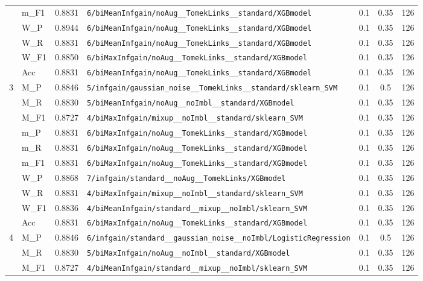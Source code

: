 \begin{table}[htbp]
\begin{tabular}{|c|l|c|>{\ttfamily\footnotesize}p{7.2cm}|c|c|c|}
 & m\_F1 & 0.8831 & \texttt{6/biMeanInfgain/noAug\_\_TomekLinks\_\_standard/XGBmodel} & 0.1 & 0.35  & 126 \\ 
 & W\_P & 0.8944 & \texttt{6/biMeanInfgain/noAug\_\_TomekLinks\_\_standard/XGBmodel} & 0.1 & 0.35  & 126 \\ 
 & W\_R & 0.8831 & \texttt{6/biMeanInfgain/noAug\_\_TomekLinks\_\_standard/XGBmodel} & 0.1 & 0.35  & 126 \\ 
 & W\_F1 & 0.8850 & \texttt{6/biMaxInfgain/noAug\_\_TomekLinks\_\_standard/XGBmodel} & 0.1 & 0.35  & 126 \\ 
 & Acc & 0.8831 & \texttt{6/biMeanInfgain/noAug\_\_TomekLinks\_\_standard/XGBmodel} & 0.1 & 0.35  & 126 \\ 
\hline
\multirow{10}{*}{3} & M\_P & 0.8846 & \texttt{5/infgain/gaussian\_noise\_\_TomekLinks\_\_standard/sklearn\_SVM} & 0.1 & 0.5  & 126 \\ 
 & M\_R & 0.8830 & \texttt{5/biMeanInfgain/noAug\_\_noImbl\_\_standard/XGBmodel} & 0.1 & 0.35  & 126 \\ 
 & M\_F1 & 0.8727 & \texttt{4/biMaxInfgain/mixup\_\_noImbl\_\_standard/sklearn\_SVM} & 0.1 & 0.35  & 126 \\ 
 & m\_P & 0.8831 & \texttt{6/biMaxInfgain/noAug\_\_TomekLinks\_\_standard/XGBmodel} & 0.1 & 0.35  & 126 \\ 
 & m\_R & 0.8831 & \texttt{6/biMaxInfgain/noAug\_\_TomekLinks\_\_standard/XGBmodel} & 0.1 & 0.35  & 126 \\ 
 & m\_F1 & 0.8831 & \texttt{6/biMaxInfgain/noAug\_\_TomekLinks\_\_standard/XGBmodel} & 0.1 & 0.35  & 126 \\ 
 & W\_P & 0.8868 & \texttt{7/infgain/standard\_\_noAug\_\_TomekLinks/XGBmodel} & 0.1 & 0.35  & 126 \\ 
 & W\_R & 0.8831 & \texttt{4/biMaxInfgain/mixup\_\_noImbl\_\_standard/sklearn\_SVM} & 0.1 & 0.35  & 126 \\ 
 & W\_F1 & 0.8836 & \texttt{4/biMeanInfgain/standard\_\_mixup\_\_noImbl/sklearn\_SVM} & 0.1 & 0.35  & 126 \\ 
 & Acc & 0.8831 & \texttt{6/biMaxInfgain/noAug\_\_TomekLinks\_\_standard/XGBmodel} & 0.1 & 0.35  & 126 \\ 
\hline
\multirow{10}{*}{4} & M\_P & 0.8846 & \texttt{6/infgain/standard\_\_gaussian\_noise\_\_noImbl/LogisticRegression} & 0.1 & 0.5  & 126 \\ 
 & M\_R & 0.8830 & \texttt{5/biMaxInfgain/noAug\_\_noImbl\_\_standard/XGBmodel} & 0.1 & 0.35  & 126 \\ 
 & M\_F1 & 0.8727 & \texttt{4/biMeanInfgain/standard\_\_mixup\_\_noImbl/sklearn\_SVM} & 0.1 & 0.35  & 126 \\ 

\end{tabular}
\end{table}

